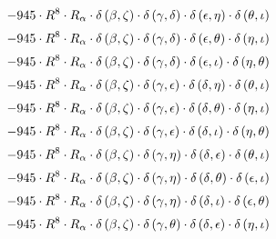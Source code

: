 \begin{subequations}
\begin{gather}
 \\[0.2em] \notag 		 - 945 \cdot R^{8} \cdot R_{\alpha{}} \cdot \delta{}\left(\beta{}, \zeta{}\right) \cdot \delta{}\left(\gamma{}, \delta{}\right) \cdot \delta{}\left(\epsilon{}, \eta{}\right) \cdot \delta{}\left(\theta{}, \iota{}\right) 
 \\[0.2em] \notag 		 - 945 \cdot R^{8} \cdot R_{\alpha{}} \cdot \delta{}\left(\beta{}, \zeta{}\right) \cdot \delta{}\left(\gamma{}, \delta{}\right) \cdot \delta{}\left(\epsilon{}, \theta{}\right) \cdot \delta{}\left(\eta{}, \iota{}\right) 
 \\[0.2em] \notag 		 - 945 \cdot R^{8} \cdot R_{\alpha{}} \cdot \delta{}\left(\beta{}, \zeta{}\right) \cdot \delta{}\left(\gamma{}, \delta{}\right) \cdot \delta{}\left(\epsilon{}, \iota{}\right) \cdot \delta{}\left(\eta{}, \theta{}\right) 
 \\[0.2em] \notag 		 - 945 \cdot R^{8} \cdot R_{\alpha{}} \cdot \delta{}\left(\beta{}, \zeta{}\right) \cdot \delta{}\left(\gamma{}, \epsilon{}\right) \cdot \delta{}\left(\delta{}, \eta{}\right) \cdot \delta{}\left(\theta{}, \iota{}\right) 
 \\[0.2em] \notag 		 - 945 \cdot R^{8} \cdot R_{\alpha{}} \cdot \delta{}\left(\beta{}, \zeta{}\right) \cdot \delta{}\left(\gamma{}, \epsilon{}\right) \cdot \delta{}\left(\delta{}, \theta{}\right) \cdot \delta{}\left(\eta{}, \iota{}\right) 
 \\[0.2em] \notag 		 - 945 \cdot R^{8} \cdot R_{\alpha{}} \cdot \delta{}\left(\beta{}, \zeta{}\right) \cdot \delta{}\left(\gamma{}, \epsilon{}\right) \cdot \delta{}\left(\delta{}, \iota{}\right) \cdot \delta{}\left(\eta{}, \theta{}\right) 
 \\[0.2em] \notag 		 - 945 \cdot R^{8} \cdot R_{\alpha{}} \cdot \delta{}\left(\beta{}, \zeta{}\right) \cdot \delta{}\left(\gamma{}, \eta{}\right) \cdot \delta{}\left(\delta{}, \epsilon{}\right) \cdot \delta{}\left(\theta{}, \iota{}\right) 
 \\[0.2em] \notag 		 - 945 \cdot R^{8} \cdot R_{\alpha{}} \cdot \delta{}\left(\beta{}, \zeta{}\right) \cdot \delta{}\left(\gamma{}, \eta{}\right) \cdot \delta{}\left(\delta{}, \theta{}\right) \cdot \delta{}\left(\epsilon{}, \iota{}\right) 
 \\[0.2em] \notag 		 - 945 \cdot R^{8} \cdot R_{\alpha{}} \cdot \delta{}\left(\beta{}, \zeta{}\right) \cdot \delta{}\left(\gamma{}, \eta{}\right) \cdot \delta{}\left(\delta{}, \iota{}\right) \cdot \delta{}\left(\epsilon{}, \theta{}\right) 
 \\[0.2em] \notag 		 - 945 \cdot R^{8} \cdot R_{\alpha{}} \cdot \delta{}\left(\beta{}, \zeta{}\right) \cdot \delta{}\left(\gamma{}, \theta{}\right) \cdot \delta{}\left(\delta{}, \epsilon{}\right) \cdot \delta{}\left(\eta{}, \iota{}\right) 

\end{gather}
\end{subequations}
